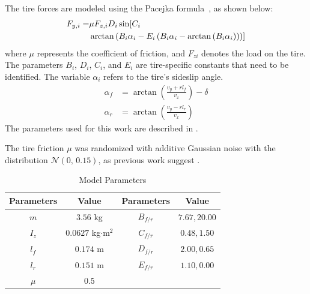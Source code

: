 \documentclass[letterpaper, conference]{IEEEtran}
\begin{document}
The tire forces are modeled using the Pacejka formula~\cite{PACEJKA20121}, as shown below:
\begin{align}
F_{y,i}=&\mu F_{z,i}D_i \sin  [C_i  \notag\\ &\arctan\left(B_i \alpha_i-E_i \left(B_i \alpha_i-\arctan\left(B_i \alpha_i\right) \right) \right) ]
\end{align}
where \( \mu \) represents the coefficient of friction, and \( F_{zi} \) denotes the load on the tire. The parameters \( B_i \), \( D_i \), \( C_i \), and \( E_i \) are tire-specific constants that need to be identified. The variable \( \alpha_i \) refers to the tire's sideslip angle.
\begin{align}
\alpha_f&=\arctan\left(\frac{v_y+ r l_f}{v_x}\right)-\delta \\
\alpha_r&=\arctan\left(\frac{v_y- r l_r}{v_x}\right)
\end{align}
The parameters used for this work are described in .


The tire friction $\mu$ was randomized with additive Gaussian noise with the distribution $\mathcal{N}(0,\,0.15)$, as previous work suggest \cite{Ghignone2023tcdriver, kaufmann2022benchmark}.
\begin{table}[htb]
        \centering
        \begin{tabular}{cccc}
        \toprule
        \textbf{ Parameters}& \textbf{Value}& \textbf{ Parameters}&\textbf{Value}\\
        \midrule
        $m$&           $3.56$ kg&                   $B_{f/r}$&           $7.67,20.00 $\\
        $I_{z}$&       $0.0627$ kg$\cdot$m$^{2}$&     $C_{f/r}$&           $0.48, 1.50$\\
        $l_f$&         $0.174$ m&                    $D_{f/r}$&           $2.00, 0.65$\\
        $l_r$&         $0.151$ m&                    $E_{f/r}$&           $1.10, 0.00$\\
        $\mu $&        $0.5$&                             &                    \\
        \bottomrule
        \end{tabular}
        \caption{Model Parameters}\label{tab:vehicle_parm}
\end{table}
\end{document}
